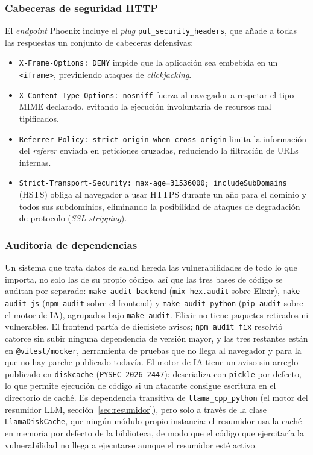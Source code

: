 \subsubsection{Cabeceras de seguridad HTTP}

El \emph{endpoint} Phoenix incluye el \emph{plug} \texttt{put\_security\_headers}, que añade a todas las respuestas un conjunto de cabeceras defensivas:

\begin{itemize}
 \item \texttt{X-Frame-Options: DENY} impide que la aplicación sea embebida en un \texttt{<iframe>}, previniendo ataques de \emph{clickjacking}.
 \item \texttt{X-Content-Type-Options: nosniff} fuerza al navegador a respetar el tipo MIME declarado, evitando la ejecución involuntaria de recursos mal tipificados.
 \item \texttt{Referrer-Policy: strict-origin-when-cross-origin} limita la información del \emph{referer} enviada en peticiones cruzadas, reduciendo la filtración de URLs internas.
 \item \texttt{Strict-Transport-Security: max-age=31536000; includeSubDomains} (HSTS) obliga al navegador a usar HTTPS durante un año para el dominio y todos sus subdominios, eliminando la posibilidad de ataques de degradación de protocolo (\emph{SSL stripping}).
\end{itemize}

\subsubsection{Auditoría de dependencias}

Un sistema que trata datos de salud hereda las vulnerabilidades de todo lo que importa, no solo las de su propio código, así que las tres bases de código se auditan por separado: \texttt{make audit-backend} (\texttt{mix hex.audit} sobre Elixir), \texttt{make audit-js} (\texttt{npm audit} sobre el frontend) y \texttt{make audit-python} (\texttt{pip-audit} sobre el motor de IA), agrupados bajo \texttt{make audit}. Elixir no tiene paquetes retirados ni vulnerables. El frontend partía de diecisiete avisos; \texttt{npm audit fix} resolvió catorce sin subir ninguna dependencia de versión mayor, y las tres restantes están en \texttt{@vitest/mocker}, herramienta de pruebas que no llega al navegador y para la que no hay parche publicado todavía. El motor de IA tiene un aviso sin arreglo publicado en \texttt{diskcache} (\texttt{PYSEC-2026-2447\allowbreak}): deserializa con \texttt{pickle} por defecto, lo que permite ejecución de código si un atacante consigue escritura en el directorio de caché. Es dependencia transitiva de \texttt{llama\_cpp\_python} (el motor del resumidor LLM, sección~\ref{sec:resumidor}), pero solo a través de la clase \texttt{LlamaDiskCache}, que ningún módulo propio instancia: el resumidor usa la caché en memoria por defecto de la biblioteca, de modo que el código que ejercitaría la vulnerabilidad no llega a ejecutarse aunque el resumidor esté activo.

